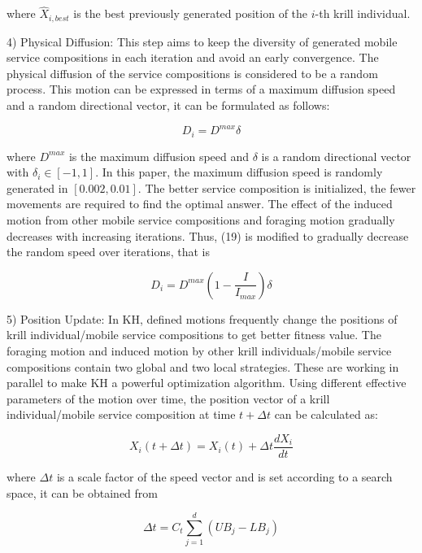 \documentclass[10pt,journal,compsoc]{IEEEtran}
\begin{document}
where $\hat{X}_{i,best}$ is the best previously generated position of the $i$-th krill individual.

4) Physical Diffusion: This step aims to keep the diversity of generated mobile service compositions in each iteration and avoid an early convergence. The physical diffusion of the service compositions is considered to be a random process. This motion can be expressed in terms of a maximum diffusion speed and a random directional vector, it can be formulated as follows:

\begin{equation}
D_i = D^{max}\delta
\end{equation}

where $D^{max}$ is the maximum diffusion speed and $\delta$ is a random directional vector with $\delta_i \in [−1, 1]$. In this paper, the maximum diffusion speed is randomly generated in $[0.002, 0.01]$. The better service composition is initialized, the fewer movements are required to find the optimal answer. The effect of the induced motion from other mobile service compositions and foraging motion gradually decreases with increasing iterations. Thus, (19) is modified to gradually decrease the random speed over iterations, that is

\begin{equation}
D_i = D^{max}(1-\frac{I}{I_{max}})\delta
\end{equation}

5) Position Update: In KH, defined motions frequently change the positions of krill individual/mobile service compositions to get better fitness value. The foraging motion and induced motion by other krill individuals/mobile service compositions contain two global and two local strategies. These are working in parallel to make KH a powerful optimization algorithm. Using different effective parameters of the motion over time, the position vector of a krill individual/mobile service composition at time $t + \Delta t$ can be calculated as:

\begin{equation}
X_i(t+\Delta t) = X_i(t) + \Delta t \frac{dX_i}{dt}
\end{equation}

where $\Delta t$ is a scale factor of the speed vector and is set according to a search space, it can be obtained from

\begin{equation}
\Delta t = C_t\sum_{j=1}^{d}(UB_j - LB_j)
\end{equation}
\end{document}
